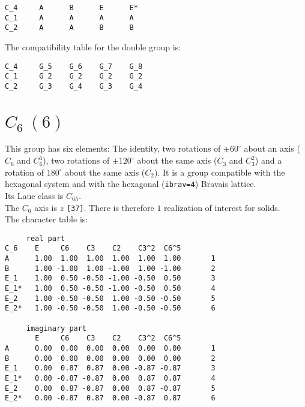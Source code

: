 \documentclass[12pt,a4paper,twoside]{report}
\begin{document}
\begin{tcolorbox}
\begin{footnotesize}
\begin{verbatim}
C_4     A      B      E      E*  
C_1     A      A      A      A
C_2     A      A      B      B
\end{verbatim}
\end{footnotesize}
\end{tcolorbox}

The compatibility table for the double group is:

\begin{tcolorbox}
\begin{footnotesize}
\begin{verbatim}
C_4     G_5    G_6    G_7    G_8 
C_1     G_2    G_2    G_2    G_2
C_2     G_3    G_4    G_3    G_4
\end{verbatim}
\end{footnotesize}
\end{tcolorbox}


\newpage
{\color{coral}\section{$C_6\ (6)$}}
\color{black}
This group has six elements: The identity, two rotations of $\pm60^\circ$ 
about an axis ($C_6$ and $C_6^5$), two rotations of $\pm120^\circ$
about the same axis ($C_3$ and $C_3^2$) and a rotation of $180^\circ$ about 
the same axis ($C_2$).
It is a group compatible with the hexagonal system and with the
hexagonal (\texttt{ibrav=4}) Bravais lattice. \\ 
Its Laue class is $C_{6h}$. \\
The $C_6$ axis is $z$ \texttt{[37]}.
There is therefore $1$ realization of interest for solids. \\
The character table is:

\begin{tcolorbox}
\begin{footnotesize}
\begin{verbatim}
     real part
C_6    E     C6    C3    C2    C3^2  C6^5 
A      1.00  1.00  1.00  1.00  1.00  1.00       1
B      1.00 -1.00  1.00 -1.00  1.00 -1.00       2
E_1    1.00  0.50 -0.50 -1.00 -0.50  0.50       3 
E_1*   1.00  0.50 -0.50 -1.00 -0.50  0.50       4
E_2    1.00 -0.50 -0.50  1.00 -0.50 -0.50       5
E_2*   1.00 -0.50 -0.50  1.00 -0.50 -0.50       6

     imaginary part
       E     C6    C3    C2    C3^2  C6^5 
A      0.00  0.00  0.00  0.00  0.00  0.00       1
B      0.00  0.00  0.00  0.00  0.00  0.00       2
E_1    0.00  0.87  0.87  0.00 -0.87 -0.87       3
E_1*   0.00 -0.87 -0.87  0.00  0.87  0.87       4
E_2    0.00  0.87 -0.87  0.00  0.87 -0.87       5
E_2*   0.00 -0.87  0.87  0.00 -0.87  0.87       6
\end{verbatim}
\end{footnotesize}
\end{tcolorbox}
\end{document}

